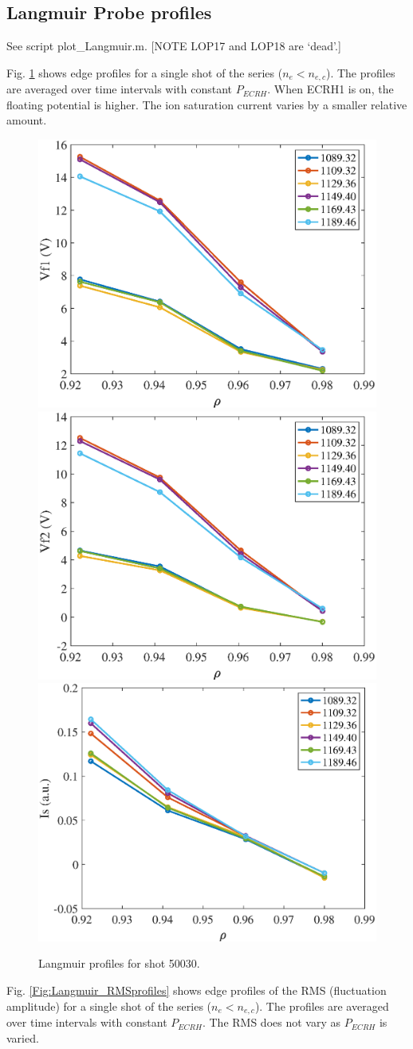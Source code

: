 \documentclass[preprint,12pt,authoryear]{elsarticle}
\begin{document}
\clearpage
\subsection{Langmuir Probe profiles}

See script plot\_Langmuir.m. [NOTE LOP17 and LOP18 are `dead'.]

Fig. \ref{Fig:Langmuir_profiles} shows edge profiles for a single shot of the series ($n_e < n_{e,c}$).
The profiles are averaged over time intervals with constant $P_{ECRH}$.
When ECRH1 is on, the floating potential is higher. The ion saturation current varies by a smaller relative amount.

\begin{figure}[!ht]
\centering
   \includegraphics[width=0.32\columnwidth]{Images/50030_VF1_.eps}
   \includegraphics[width=0.32\columnwidth]{Images/50030_VF2_.eps}
   \includegraphics[width=0.32\columnwidth]{Images/50030_Is_.eps}
   \caption{Langmuir profiles for shot 50030.}
   \label{Fig:Langmuir_profiles}
\end{figure}

Fig. \ref{Fig:Langmuir_RMSprofiles} shows edge profiles of the RMS (fluctuation amplitude) for a single shot of the series ($n_e < n_{e,c}$).
The profiles are averaged over time intervals with constant $P_{ECRH}$.
The RMS does not vary as $P_{ECRH}$ is varied.
\end{document}
